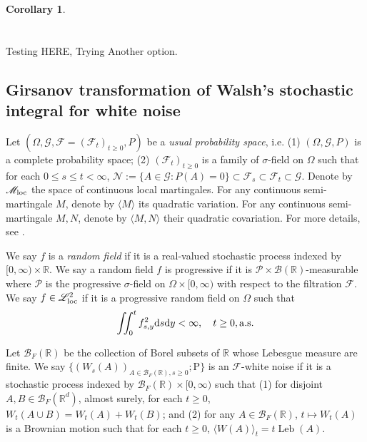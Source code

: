 \documentclass[12pt,a4paper]{amsart}
\numberwithin{equation}{section}
\theoremstyle{plain}
\newtheorem{corollary}[theorem]{Corollary}
\theoremstyle{remark}
\begin{document}
\begin{corollary}
\end{corollary}

\appendix
\section{}
{\color{red}Testing HERE, Trying Another option.}
\subsection{Girsanov transformation of Walsh's stochastic integral for white noise}
Let $(\Omega, \mathcal G, \mathcal F = (\mathcal F_t)_{t\geq 0}, P)$ be a \emph{usual probability space}, i.e. (1) $(\Omega, \mathcal G, P)$ is a complete probability space; (2) $(\mathcal F_t)_{t\geq 0}$ is a family of $\sigma$-field on $\Omega$  such that for each $0\leq s\leq t<\infty$, $\mathcal N:= \{A\in \mathcal G: P(A) = 0\} \subset \mathcal F_s\subset \mathcal F_t \subset \mathcal G$.
Denote by $\mathscr M_{\rm loc}$ the space of continuous local martingales.
For any continuous semi-martingale $M$, denote by $\langle M \rangle$ its quadratic variation. 
For any continuous semi-martingale $M, N$, denote by $\langle M, N\rangle$ their quadratic covariation.
For more details, see \cite[Chapter 17]{Kallenberg2002Foundations}.

We say $f$ is a \emph{random field} if it is a real-valued stochastic process indexed by $[0,\infty)\times \mathbb R$.
We say a random field $f$ is progressive if it is $\mathcal P \times \mathcal B(\mathbb R)$-measurable where $\mathcal P$ is the progressive $\sigma$-field on $\Omega \times [0,\infty)$ with respect to the filtration $\mathcal F$.
We say $f\in \mathscr L^2_{\rm loc}$ if it is a progressive random field on $\Omega$ such that
\[
\iint_0^t f^2_{s,y} \mathrm ds\mathrm dy < \infty, \quad t\geq 0, {\rm a.s.}
\]

Let $\mathcal B_F(\mathbb R)$ be the collection of Borel subsets of $\mathbb R$ whose Lebesgue measure are finite.
We say $\{(W_s(A))_{A \in \mathcal B_F(\mathbb R),s\geq 0}; \mathrm P\}$ is an $\mathcal F$-white noise if it is a stochastic process indexed by $\mathcal B_F(\mathbb R)\times [0,\infty)$ such that 
(1)  for disjoint $A,B\in \mathcal B_F(\mathbb R^d)$, almost surely, for each $t\geq 0$, $W_t(A\cup B) = W_t(A) + W_t(B)$; and
(2) for any $A \in \mathcal B_F(\mathbb R)$, $t\mapsto W_t(A)$ is a Brownian motion such that for each $t\geq 0$, $\langle W(A) \rangle_t = t \operatorname{Leb}(A)$. 
\end{document}

